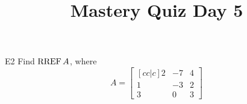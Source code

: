 \documentclass{sbgLAquiz}
\title{Mastery Quiz Day 5 }
\begin{document}
\begin{problem}{E2}
Find \(\operatorname{RREF} A\), where
\[
  A =
  \begin{bmatrix}[cc|c]
    2 & -7 & 4 \\
    1 & -3 & 2 \\
    3 & 0 & 3
  \end{bmatrix}
\]
\end{problem}
\end{document}
